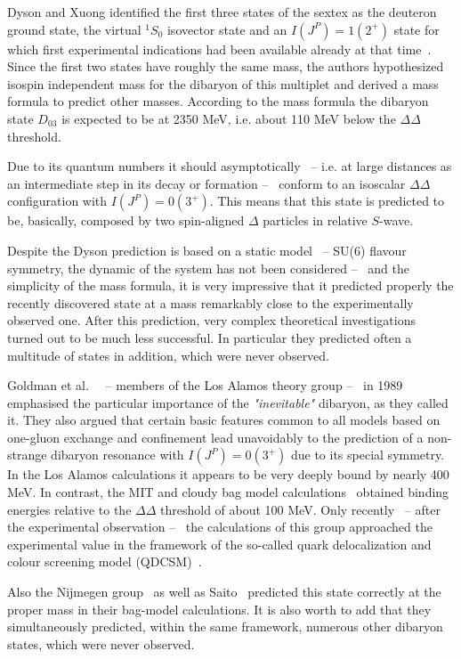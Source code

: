 Dyson and Xuong identified the first three states of the sextex as the deuteron ground state, the virtual
$^{1}S_{0}$ isovector state and an $I(J^{P}) = 1(2^{+})$ state for which first experimental indications
had been available already at that time~\cite{neganov}.
Since the first two states have roughly the same mass, the authors hypothesized isospin independent mass for the 
dibaryon of this multiplet and derived a mass formula to predict other masses.
According to the mass formula the dibaryon state $D_{03}$ is expected to be at 2350 MeV, 
i.e. about 110 MeV below the $\Delta \Delta$ threshold.

Due to its quantum numbers it should asymptotically \ -- i.e. at large distances as an intermediate
step in its decay or formation -- \ conform to an isoscalar $\Delta \Delta$ configuration with
$I(J^{P}) = 0(3^{+})$. This means that this state is predicted to be, basically, composed by two spin-aligned $\Delta$ particles
in relative $S$-wave.

Despite the Dyson prediction is based on a static model \ -- SU(6) flavour symmetry, the dynamic
of the system has not been considered -- \ and the simplicity of the mass formula, it is very 
impressive that it predicted properly the recently discovered state \dst at a mass remarkably close to the
experimentally observed one. 
After this prediction, very complex theoretical investigations turned out to be much less successful.
In particular they predicted often a multitude of states in addition, which were never observed.

Goldman et al.~\cite{dsinevitable1} \ -- members of the Los Alamos theory group -- \ in 1989 emphasised
the particular importance of the \textit{"inevitable"} \ds dibaryon, as they called it.
They also argued that certain basic features common to all models based on one-gluon exchange
and confinement lead unavoidably to the prediction of a non-strange dibaryon resonance \ds 
with $I(J^{P}) = 0(3^{+})$ due to its special symmetry.
In the Los Alamos calculations it appears to be very deeply bound by nearly 400 MeV.
In contrast, the MIT and cloudy bag model calculations~\cite{dibpred2,dibpred5,dibpred6}
obtained binding energies relative to the
$\Delta \Delta$ threshold of about 100 MeV.
Only recently \ -- after the experimental observation -- \ the calculations of this group approached
the experimental value in the framework of the so-called quark delocalization and colour screening model
(QDCSM)~\cite{dsqm1}.

Also the Nijmegen group~\cite{dibpred1,dibpred2,dibpred3} as well as Saito~\cite{dibpred6} predicted
this state correctly at the proper mass in their bag-model calculations. It is also worth to add that they simultaneously predicted,
within the same framework, numerous other dibaryon states, which were never observed.


